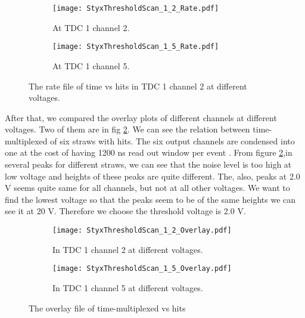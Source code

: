 \begin{figure}[H]
	\centering
	\begin{subfigure}[t]{0.8\textwidth}
		\begin{center}
\texttt{[image: StyxThresholdScan\_1\_2\_Rate.pdf]}
		\end{center}
		\caption{At TDC 1 channel 2.}
	\end{subfigure}
	
	\begin{subfigure}[t]{0.8\textwidth}
		\begin{center}
	\texttt{[image: StyxThresholdScan\_1\_5\_Rate.pdf]}
		\end{center}
		\caption{At TDC 1 channel 5.}
	\end{subfigure}
	\caption{The rate file of time vs hits in TDC 1 channel 2 at different voltages.}%
	\label{fig:rate}
\end{figure}

After that, we compared the overlay plots of different channels at different voltages. Two of them are in fig \ref{fig:Overlay}. We can see the relation between time-multiplexed of six straws with hits. The six output channels are condensed into one at the cost of having \num{1200} ns read out window per event \cite{manual}. From figure \ref{fig:Overlay},in several peaks for different straws, we can see that the noise level is too high at low voltage and heights of these peaks are quite different. The, also, peaks at \num{2.0} V seems quite same for all channels, but not at all other voltages. We want to find the lowest voltage so that the peaks seem to be of the same heights we can see it at \num{20} V. Therefore we choose the threshold voltage is \num{2.0} V.

\begin{figure}[H]
	\centering
\begin{subfigure}{0.8\textwidth}
 \begin{center}
 \texttt{[image: StyxThresholdScan\_1\_2\_Overlay.pdf]}
 \end{center}
 	\caption{In TDC 1 channel 2 at different voltages.}
 \end{subfigure}
 
 \begin{subfigure}{0.8\textwidth}
 	\begin{center}
 \texttt{[image: StyxThresholdScan\_1\_5\_Overlay.pdf]}
 	\end{center}
 	\caption{In TDC 1 channel 5 at different voltages.}
 \end{subfigure}
 \caption{The overlay file of time-multiplexed vs hits}
 	\label{fig:Overlay}
 \end{figure}
 
 

 
	
